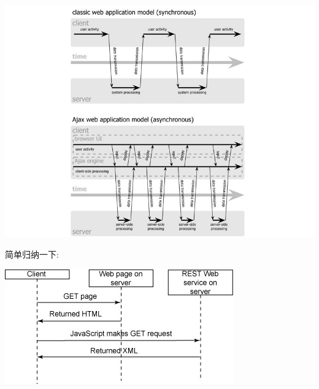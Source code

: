 \documentclass{beamer}
\begin{document}
\begin{frame}[plain]
	\begin{center}
	\includegraphics[width=\textwidth]{images/ajax-fig2-small.jpg}
	\end{center}
\end{frame}

\begin{frame}[plain]
	简单归纳一下:\\
	\begin{center}
	\includegraphics[width=.7\textwidth]{images/ajax-sequence-simplified.jpg}
	\end{center}
\end{frame}
\end{document}
